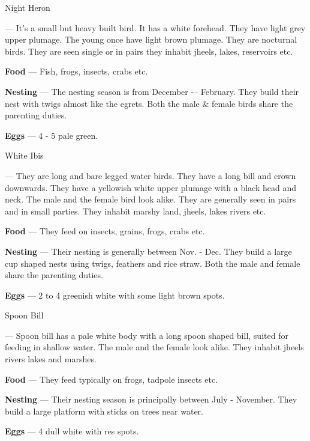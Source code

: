 \begin{bird}{Night Heron}

 --- It's a small but heavy built bird. It has a white forehead. They have light grey upper plumage. The young once have light brown plumage. They are nocturnal birds. They are seen single or in pairs they inhabit jheels, lakes, reservoirs etc.

{\large\bf Food} --- Fish, frogs, insects, crabs etc.

{\large\bf Nesting} --- The nesting season is from December -– February. They build their nest with twigs almost like the egrets. Both the male \& female birds share the parenting duties.

{\bf Eggs} --- 4 - 5 pale green.
\end{bird}


\begin{bird}{White Ibis}

 --- They are long and bare legged water birds. They have a long bill and crown downwards. They have a yellowish white upper plumage with a black head and neck. The male and the female bird look alike. They are generally seen in pairs and in small parties. They inhabit marshy land, jheels, lakes rivers etc.

{\large\bf Food} --- They feed on insects, grains, frogs, crabs etc.

{\large\bf Nesting} --- Their nesting is generally between Nov. - Dec. They build a large cup shaped nests using twigs, feathers and rice straw. Both the male and female share the parenting duties. 

{\large\bf Eggs} --- 2 to 4 greenish white with some light brown spots.
\end{bird}

\begin{bird}{Spoon Bill}

 --- Spoon bill has a pale white body with a long spoon shaped bill, suited for feeding in shallow water. The male and the female look alike. They inhabit jheels rivers lakes and marshes. 

{\large\bf Food} --- They feed typically on frogs, tadpole insects etc.

{\large\bf Nesting} --- Their nesting season is principally between July - November. They build a large platform with sticks on trees near water. 

{\large\bf Eggs} --- 4 dull white with res spots.
\end{bird}

